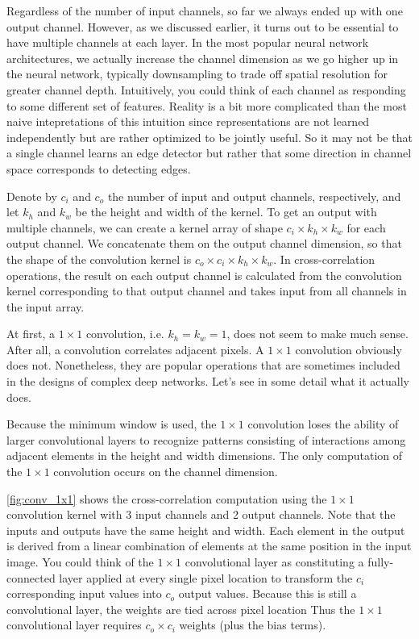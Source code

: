 
Regardless of the number of input channels, so far we always ended up with one output channel. However, as we discussed earlier, it turns out to be essential to have multiple channels at each layer. In the most popular neural network architectures, we actually increase the channel dimension as we go higher up in the neural network, typically downsampling to trade off spatial resolution for greater channel depth. Intuitively, you could think of each channel as responding to some different set of features. Reality is a bit more complicated than the most naive intepretations of this intuition since representations are not learned independently but are rather optimized to be jointly useful. So it may not be that a single channel learns an edge detector but rather that some direction in channel space corresponds to detecting edges.

Denote by $c_i$ and $c_o$  the number of input and output channels, respectively, and let $k_h$ and $k_w$ be the height and width of the kernel. To get an output with multiple channels, we can create a kernel array of shape $c_i \times k_h \times k_w$ for each output channel. We concatenate them on the output channel dimension, so that the shape of the convolution kernel is $c_o \times c_i \times k_h \times k_w$. In cross-correlation operations, the result on each output channel is calculated from the convolution kernel corresponding to that output channel and takes input from all channels in the input array.


At first, a $1 \times 1$  convolution, i.e.  $k_h=k_w=1$, does not seem to make much sense. After all, a convolution correlates adjacent pixels. A $1 \times 1$ convolution obviously does not. Nonetheless, they are popular operations that are sometimes included in the designs of complex deep networks. Let’s see in some detail what it actually does.

Because the minimum window is used, the $1 \times 1$ convolution loses the ability of larger convolutional layers to recognize patterns consisting of interactions among adjacent elements in the height and width dimensions. The only computation of the $1 \times 1$ convolution occurs on the channel dimension.

\cref{fig:conv_1x1} shows the cross-correlation computation using the $1 \times 1$ convolution kernel with 3 input channels and 2 output channels. Note that the inputs and outputs have the same height and width. Each element in the output is derived from a linear combination of elements at the same position in the input image. You could think of the $1 \times 1$  convolutional layer as constituting a fully-connected layer applied at every single pixel location to transform the $c_i$ corresponding input values into $c_o$ output values. Because this is still a convolutional layer, the weights are tied across pixel location Thus the $1 \times 1$  convolutional layer requires $c_o \times c_i$ weights (plus the bias terms).


